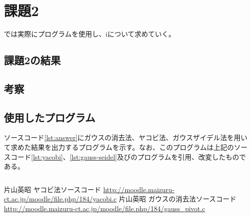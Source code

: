 \documentclass[12pt]{jsarticle}
\begin{document}
\section{課題2}
では実際にプログラムを使用し、iについて求めていく。
\subsection{課題2の結果}
\subsection{考察}
\subsection{使用したプログラム}
ソースコード\ref{lst:answer}にガウスの消去法、ヤコビ法、ガウスザイデル法を用いて求めた結果を出力するプログラムを示す。なお、このプログラムは上記のソースコード\ref{lst:yacobi}、\ref{lst:gauss-seidel}及び\cite{gaussian}のプログラムを引用、改変したものである。

\begin{lstlisting}[caption=answer.c,label={lst:answer}]
\end{lstlisting}



\begin{thebibliography}{9}
	 片山英昭 ヤコビ法ソースコード \url{http://moodle.maizuru-ct.ac.jp/moodle/file.php/184/yacobi.c}
	 片山英昭 ガウスの消去法ソースコード \url{http://moodle.maizuru-ct.ac.jp/moodle/file.php/184/gauss_pivot.c}
\end{thebibliography}
\end{document}
